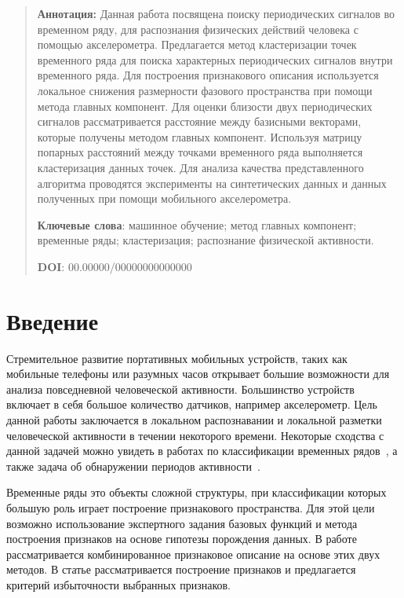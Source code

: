 \documentclass[12pt, twoside]{article}
\begin{document}
{\centering\begin{quote}
\textbf{Аннотация:} Данная работа посвящена поиску периодических сигналов во временном ряду, для распознания физических действий человека с помощью акселерометра. Предлагается метод кластеризации точек временного ряда для поиска характерных периодических сигналов внутри временного ряда. Для построения признакового описания используется локальное снижения размерности фазового пространства при помощи метода главных компонент. Для оценки близости двух периодических сигналов рассматривается расстояние между базисными векторами, которые получены методом главных компонент. Используя матрицу попарных расстояний между точками временного ряда выполняется кластеризация данных точек. Для анализа качества представленного алгоритма проводятся эксперименты на синтетических данных и данных полученных при помощи мобильного акселерометра.


\smallskip
\textbf{Ключевые слова}: машинное обучение; метод главных компонент; временные ряды; кластеризация; распознание физической активности.

\smallskip
\textbf{DOI}: 00.00000/00000000000000
\end{quote}
}

\section{Введение}
Стремительное развитие портативных мобильных устройств, таких как мобильные телефоны или разумных часов открывает большие возможности для анализа повседневной человеческой активности. Большинство устройств включает в себя большое количество датчиков, например акселерометр. Цель данной работы заключается в локальном распознавании и локальной разметки человеческой активности в течении некоторого времени. Некоторые сходства с данной задачей можно увидеть в работах по классификации временных рядов~\cite{Ignatov2015}, а также задача об обнаружении периодов активности~\cite{Olivares2012, cinar2018}.

Временные ряды это объекты сложной структуры, при классификации которых большую роль играет построение признакового пространства. Для этой цели возможно использование экспертного задания базовых функций и метода построения признаков на основе гипотезы порождения данных. В работе \cite{Ivkin2015} рассматривается комбинированное признаковое описание на основе этих двух методов. В статье \cite{Katrutsa2015} рассматривается построение признаков и предлагается критерий избыточности выбранных признаков.
\end{document}
